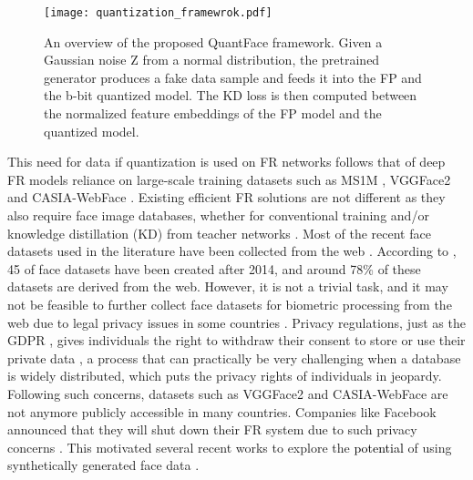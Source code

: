 \documentclass[a4paper,conference]{IEEEtran}
\begin{document}
\begin{figure*}[t!]
     \centering
         \texttt{[image: quantization\_framewrok.pdf]}
         \vspace{-2mm}
         \caption{ An overview of the proposed QuantFace framework. Given a Gaussian noise Z from a normal distribution, the pretrained generator produces a fake data sample and feeds it into the FP and the b-bit quantized model. The KD loss is then computed between the normalized feature embeddings of the FP model and the quantized model.     }
 \label{fig:framewrok}
 \vspace{-5mm}
\end{figure*}

This need for data if quantization is used on FR networks follows that of deep FR models reliance on large-scale training datasets \cite{mobilefacenet,mixfacenet,deng2019arcface} such as MS1M \cite{guo2016ms}, VGGFace2 \cite{DBLP:conf/fgr/CaoSXPZ18} and CASIA-WebFace \cite{DBLP:journals/corr/YiLLL14a}. 
Existing efficient FR solutions are not different as they also require face image databases, whether for conventional training and/or knowledge distillation (KD) from teacher networks \cite{mobilefacenet,shufflefacenet,mixfacenet,vargfacenet,pocketnet,DBLP:conf/aaai/Wang21}.
Most of the recent face datasets used in the literature have been collected from the web \cite{DBLP:journals/corr/abs-2102-00813}.
According to \cite{DBLP:journals/corr/abs-2102-00813}, 45 of face datasets have been created after 2014, and around 78\% of these datasets are derived from the web.
However, it is not a trivial task, and it may not be feasible to further collect face datasets for biometric processing from the web due to legal privacy issues in some countries \cite{sface,Qiu_2021_ICCV,gdpr,Damer_2022_CVPR}.
Privacy regulations, just as the GDPR \cite{gdpr}, gives individuals the right to withdraw their consent to store or use their private data \cite{DBLP:journals/tifs/MedenRTDKSRPS21,gdpr}, a process that can practically be very challenging when a database is widely distributed, which puts the privacy rights of individuals in jeopardy.
Following such concerns, datasets such as VGGFace2 \cite{DBLP:conf/fgr/CaoSXPZ18} and CASIA-WebFace \cite{DBLP:journals/corr/YiLLL14a} are not anymore publicly accessible in many countries. Companies like Facebook announced that they will shut down their FR system due to such privacy concerns \cite{facebook}.
This motivated several recent works to explore the \textcolor{black}{ potential} of using synthetically generated face data \cite{sface,Qiu_2021_ICCV,DBLP:journals/access/RongZL20,Damer_2022_CVPR}.    
\end{document}
